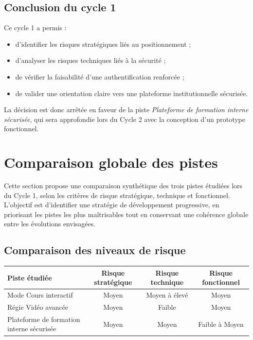 \documentclass[12pt,a4paper]{report}
\begin{document}
\subsection{Conclusion du cycle 1}

Ce cycle 1 a permis :
\begin{itemize}
  \item d’identifier les risques stratégiques liés au positionnement ;
  \item d’analyser les risques techniques liés à la sécurité ;
  \item de vérifier la faisabilité d’une authentification renforcée ;
  \item de valider une orientation claire vers une plateforme institutionnelle sécurisée.
\end{itemize}

La décision est donc arrêtée en faveur de la piste
\textit{Plateforme de formation interne sécurisée}, qui sera approfondie lors du
Cycle 2 avec la conception d’un prototype fonctionnel.

\newpage
\section{Comparaison globale des pistes}
\label{sec:comparaison_globale}

Cette section propose une comparaison synthétique des trois pistes étudiées lors
du Cycle 1, selon les critères de risque stratégique, technique et fonctionnel.
L’objectif est d’identifier une stratégie de développement progressive, en
priorisant les pistes les plus maîtrisables tout en conservant une cohérence
globale entre les évolutions envisagées.

\subsection{Comparaison des niveaux de risque}

\begin{center}
\begin{tabular}{|p{4.2cm}|c|c|c|}
\hline
\textbf{Piste étudiée} & \textbf{Risque stratégique} & \textbf{Risque technique} & \textbf{Risque fonctionnel} \\
\hline
Mode Cours interactif & Moyen & Moyen à élevé & Moyen \\
\hline
Régie Vidéo avancée & Moyen & Faible & Moyen \\
\hline
Plateforme de formation interne sécurisée & Moyen & Moyen & Faible à Moyen \\
\hline
\end{tabular}
\end{center}
\end{document}
